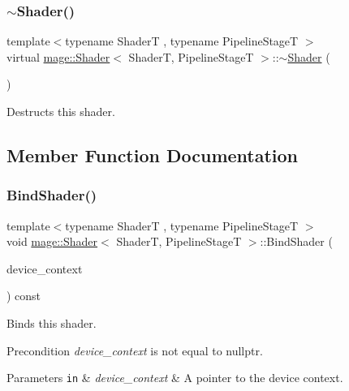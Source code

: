 \subsubsection{\texorpdfstring{$\sim$\+Shader()}{~Shader()}}
{\footnotesize\ttfamily template$<$typename ShaderT , typename Pipeline\+StageT $>$ \\
virtual \hyperlink{classmage_1_1_shader}{mage\+::\+Shader}$<$ ShaderT, Pipeline\+StageT $>$\+::$\sim$\hyperlink{classmage_1_1_shader}{Shader} (\begin{DoxyParamCaption}{ }\end{DoxyParamCaption})\hspace{0.3cm}{\ttfamily [virtual]}}

Destructs this shader. 

\subsection{Member Function Documentation}
\hypertarget{classmage_1_1_shader_ae21e9f9a4e97d8d73f3988815c1cb205}{}\label{classmage_1_1_shader_ae21e9f9a4e97d8d73f3988815c1cb205} 
\subsubsection{\texorpdfstring{Bind\+Shader()}{BindShader()}}
{\footnotesize\ttfamily template$<$typename ShaderT , typename Pipeline\+StageT $>$ \\
void \hyperlink{classmage_1_1_shader}{mage\+::\+Shader}$<$ ShaderT, Pipeline\+StageT $>$\+::Bind\+Shader (\begin{DoxyParamCaption}\item[{I\+D3\+D11\+Device\+Context4 $\ast$}]{device\+\_\+context }\end{DoxyParamCaption}) const\hspace{0.3cm}{\ttfamily [noexcept]}}

Binds this shader.

\begin{DoxyPrecond}{Precondition}
{\itshape device\+\_\+context} is not equal to {\ttfamily nullptr}. 
\end{DoxyPrecond}

\begin{DoxyParams}[1]{Parameters}
\mbox{\tt in}  & {\em device\+\_\+context} & A pointer to the device context. \\
\hline
\end{DoxyParams}
\hypertarget{classmage_1_1_shader_a235c45ff470f15367cc7381da0f01130}{}\label{classmage_1_1_shader_a235c45ff470f15367cc7381da0f01130} 
